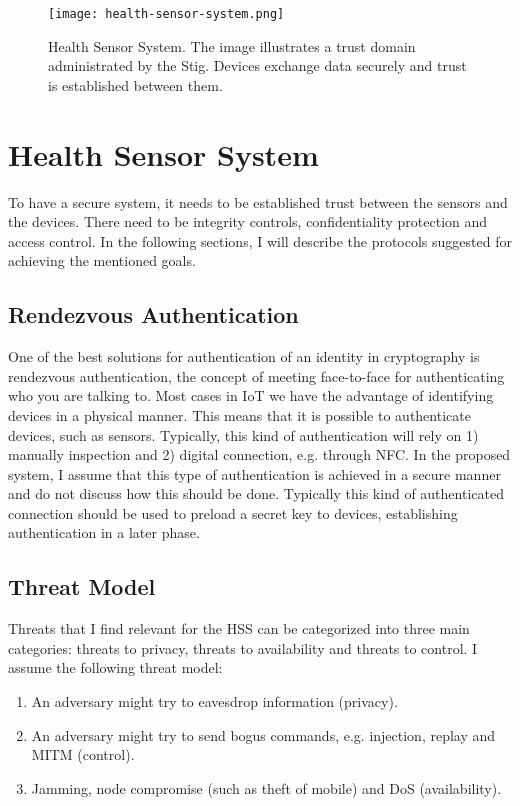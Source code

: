 \begin{figure}[ht]
  \centering
  \texttt{[image: health-sensor-system.png]}
  \caption[Health Sensor System]{Health Sensor System. 
  The image illustrates a trust domain administrated by the Stig.
  Devices exchange data securely and trust is established between them.}
  \label{fig:health-sensor-system}
\end{figure}

\section{Health Sensor System}\label{hss}
To have a secure system, it needs to be established trust between the sensors and the devices.
There need to be integrity controls, confidentiality protection and access control. 
In the following sections, I will describe the protocols suggested for achieving the mentioned goals.

\subsection{Rendezvous Authentication}\label{rendezvous_authentication}
One of the best solutions for authentication of an identity in cryptography is rendezvous authentication, the concept of meeting face-to-face for authenticating who you are talking to. 
Most cases in \gls{IoT} we have the advantage of identifying devices in a physical manner.
This means that it is possible to authenticate devices, such as sensors. 
Typically, this kind of authentication will rely on 1) manually inspection and 2) digital connection, e.g. through \gls{NFC}.
In the proposed system, I assume that this type of authentication is achieved in a secure manner and do not discuss how this should be done.
Typically this kind of authenticated connection should be used to preload a secret key to devices, establishing authentication in a later phase.

\subsection{Threat Model}
Threats that I find relevant for the \gls{HSS} can be categorized into three main categories: threats to privacy, threats to availability and threats to control.
I assume the following threat model:
\begin{enumerate}
  \item An adversary might try to eavesdrop information (privacy).
  \item An adversary might try to send bogus commands, e.g. injection, replay and \gls{MITM} (control).
  \item Jamming, node compromise (such as theft of mobile) and \gls{DoS} (availability).
\end{enumerate}

